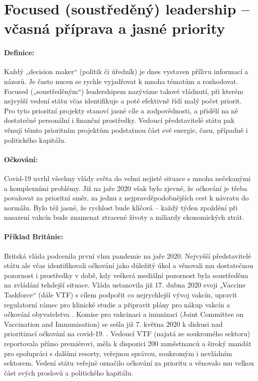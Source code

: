\section*{Focused (soustředěný) leadership -- včasná příprava a jasné priority}

\paragraph {Definice:} Každý „decision maker“ (politik či úředník) je dnes vystaven přílivu informací a názorů. Je často nucen se rychle vyjadřovat k mnoha tématům a rozhodovat. Focused („soustředěným“) leadershipem nazýváme takové vládnutí, při kterém nejvyšší vedení státu včas identifikuje a poté efektivně řídí malý počet priorit. Pro tyto prioritní projekty stanoví jasné cíle a zodpovědnosti, a přidělí na ně dostatečné personální i finanční prostředky. Vedoucí představitelé státu pak věnují těmto prioritním projektům podstatnou část své energie, času, případně i politického kapitálu.

\paragraph{Očkování:} Covid-19 uvrhl všechny vlády světa do velmi nejisté situace s mnoha nečekanými a komplexními problémy. Již na jaře 2020 však bylo zjevné, že očkování je třeba považovat za prioritní směr, za jednu z nejpravděpodobnějších cest k návratu do normálu. Bylo též jasné, že rychlost bude klíčová -- každý týden zpoždění při nasazení vakcín bude znamenat ztracené životy a miliardy ekonomických ztrát.

\paragraph{Příklad Británie:} Britská vláda podcenila první vlnu pandemie na jaře 2020. Nejvyšší představitelé státu ale včas identifikovali očkování jako důležitý úkol a věnovali mu dostatečnou pozornost i prostředky v době, kdy veškerá mediální pozornost byla soustředěna na zvládání tehdejší situace. Vláda ustanovila již 17. dubna 2020 svoji „Vaccine Taskforce“ (dále VTF) s cílem podpořit co nejrychlejší vývoj vakcín, upravit regulatorní rámec pro klinické studie a připravit plány pro nákup vakcín a očkování obyvatelstva \cite{department_for_business_energy__industrial_strategy_government_2020}. Komise pro vakcinaci a imunizaci (Joint Committee on Vaccination and Immunisation) se sešla již 7. května 2020 k diskusi nad prioritizací očkování na covid-19. \cite{department_of_health_and_social_care_joint_2020}. Vedoucí VTF (najatá ze soukromého sektoru) reportovala přímo premiérovi, měla k dispozici 200 zaměstnanců a široký mandát pro spolupráci s dalšími resorty, veřejnou správou, soukromým i nevládním sektorem. Vedení státu veřejně označilo očkování za prioritu a věnovalo mu velkou část svých proslovů a politického kapitálu.

